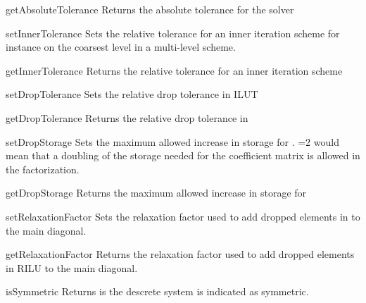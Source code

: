 \begin{methoddesc}[SolverOptions]{getAbsoluteTolerance}{}
Returns the absolute tolerance for the solver
\end{methoddesc}


\begin{methoddesc}[SolverOptions]{setInnerTolerance}{}
Sets the relative tolerance for an inner iteration scheme for instance
on the coarsest level in a multi-level scheme.
\end{methoddesc}

\begin{methoddesc}[SolverOptions]{getInnerTolerance}{}
Returns the relative tolerance for an inner iteration scheme
\end{methoddesc}

\begin{methoddesc}[SolverOptions]{setDropTolerance}{}
Sets the relative drop tolerance in ILUT
\end{methoddesc}

\begin{methoddesc}[SolverOptions]{getDropTolerance}{}
Returns the relative drop tolerance in \ILUT
\end{methoddesc}


\begin{methoddesc}[SolverOptions]{setDropStorage}{}
Sets the maximum allowed increase in storage for \ILUT. =2 would mean that a doubling of the storage needed for the coefficient matrix is allowed in the \ILUT factorization.
\end{methoddesc}

\begin{methoddesc}[SolverOptions]{getDropStorage}{}
Returns the maximum allowed increase in storage for \ILUT
\end{methoddesc}

\begin{methoddesc}[SolverOptions]{setRelaxationFactor}{}
Sets the relaxation factor used to add dropped elements in \RILU to the main diagonal.
\end{methoddesc}

\begin{methoddesc}[SolverOptions]{getRelaxationFactor}{}
Returns the relaxation factor used to add dropped elements in RILU to the main diagonal.
\end{methoddesc}

\begin{methoddesc}[SolverOptions]{isSymmetric}{}
Returns \True is the descrete system is indicated as symmetric.
\end{methoddesc}

